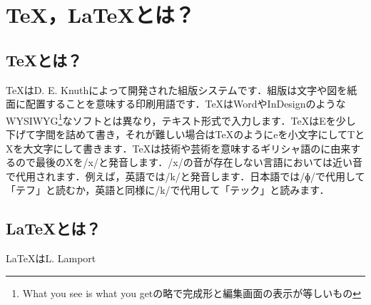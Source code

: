 \section{\TeX，\LaTeX とは？}
\subsection{\TeX とは？}
\TeX はD. E. Knuthによって開発された組版システムです．組版は文字や図を紙面に配置することを意味する印刷用語です．\TeX はWordやInDesignのようなWYSIWYG\footnote{What you see is what you getの略で完成形と編集画面の表示が等しいもの}なソフトとは異なり，テキスト形式で入力します．\TeX はEを少し下げて字間を詰めて書き，それが難しい場合はTeXのようにeを小文字にしてTとXを大文字にして書きます．\TeX は技術や芸術を意味するギリシャ語のに由来するので最後のXを/x/と発音します．/x/の音が存在しない言語においては近い音で代用されます．例えば，英語では/k/と発音します．日本語では/ɸ/で代用して「テフ」と読むか，英語と同様に/k/で代用して「テック」と読みます．
\subsection{\LaTeX とは？}
\LaTeX はL. Lamport